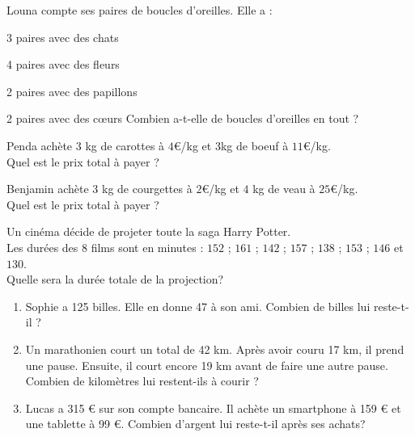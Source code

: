 \documentclass[11pt]{article}
\begin{document}
\begin{multicols}{2}
  \begin{exercice}[2]
    Louna compte ses paires de boucles d’oreilles. Elle a :
    \begin{enu}
    \item 3 paires avec des chats
    \item 4 paires avec des fleurs
    \item 2 paires avec des papillons
    \item 2 paires avec des cœurs Combien a-t-elle de boucles
      d'oreilles en tout ?
    \end{enu}
  \end{exercice}
\begin{exercice}[2]
  \begin{enu}
  \item Penda achète $3$ kg de carottes à $4$€/kg et 3kg de boeuf à $11$€/kg. \\
    Quel est le prix total à payer ?
  \item Benjamin achète $3$ kg de courgettes à $2$€/kg et $4$ kg de veau à $25$€/kg.\\
  Quel est le prix total à payer ?
  \end{enu}
\end{exercice}
\begin{exercice}[3]
  Un cinéma décide de projeter toute la saga Harry Potter. \\
  Les durées des 8 films sont en minutes : $152$ ; $161$ ; $142$ ; $157$ ; $138$ ; $153$ ; $146$ et $130$. \\
  Quelle sera la durée totale de la projection?
\end{exercice}
\begin{exercice}[3]
  \begin{enumerate}
    \item Sophie a 125 billes. Elle en donne 47 à son ami. Combien de billes lui reste-t-il ?
    \item Un marathonien court un total de 42 km. Après avoir couru 17 km, il prend une pause. Ensuite, il court encore 19 km avant de faire une autre pause. Combien de kilomètres lui restent-ils à courir ?
    \item Lucas a 315 € sur son compte bancaire. Il achète un smartphone à 159 € et une tablette à 99 €. Combien d'argent lui reste-t-il après ses achats?

\end{enumerate}
\end{exercice}
\end{multicols}
\end{document}
